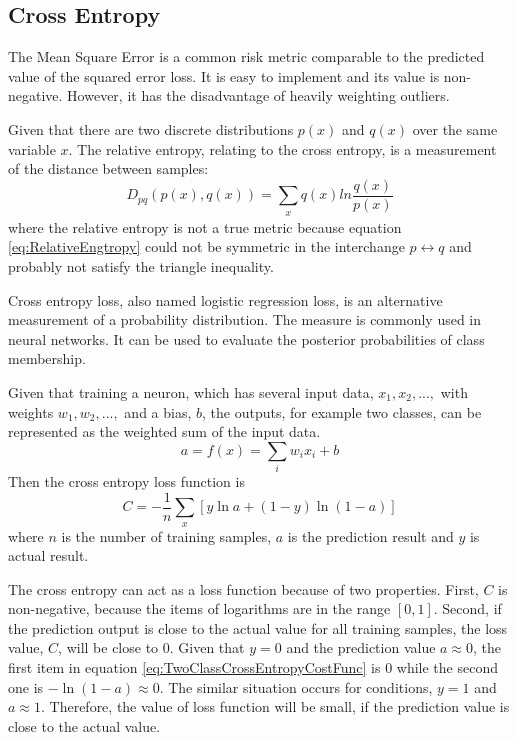 \subsection{Cross Entropy}

The Mean Square Error is a common risk metric comparable to the predicted value of the squared error loss. It is easy to implement and its value is non-negative. However, it has the disadvantage of heavily weighting outliers\citep{bermejo2001oriented}.

Given that there are two discrete distributions $p(x)$ and $q(x)$ over the same variable $x$. The relative entropy, relating to the cross entropy, is a measurement of the distance between samples:
\begin{equation}\label{eq:RelativeEngtropy}
D_{pq}(p(x), q(x)) = \sum_{\substack{x}}q(x)ln\frac{q(x)}{p(x)}
\end{equation}
where the relative entropy is not a true metric because equation \ref{eq:RelativeEngtropy} could not be symmetric in the interchange $p \leftrightarrow q$ and probably not satisfy the triangle inequality.

Cross entropy loss, also named logistic regression loss, is an alternative measurement of a probability distribution. The measure is commonly used in neural networks. It can be used to evaluate the posterior probabilities of class membership.

Given that training a neuron, which has several input data, $x_{1}, x_{2},...,$ with weights $w_{1}, w_{2},...,$ and a bias, $b$, the outputs, for example two classes, can be represented as the weighted sum of the input data.
\begin{equation}\label{eq:EquationNN}
a = f(x) = \sum_{i}w_{i}x_{i} + b
\end{equation}
Then the cross entropy loss function is
\begin{equation}\label{eq:TwoClassCrossEntropyCostFunc}
C = -\frac{1}{n} \sum_x \left[y \ln a + (1-y ) \ln (1-a) \right]
\end{equation}
where $n$ is the number of training samples, $a$ is the prediction result and $y$ is actual result.

The cross entropy can act as a loss function because of two properties. First, $C$ is non-negative, because the items of logarithms are in the range $[0,1]$. Second, if the prediction output is close to the actual value for all training samples, the loss value, $C$, will be close to $0$. Given that $y = 0$ and the prediction value $a \approx 0$, the first item in equation \ref{eq:TwoClassCrossEntropyCostFunc} is $0$ while the second one is $-\ln(1-a) \approx 0$. The similar situation occurs for conditions, $y = 1$ and $a \approx 1$. Therefore, the value of loss function will be small, if the prediction value is close to the actual value.

